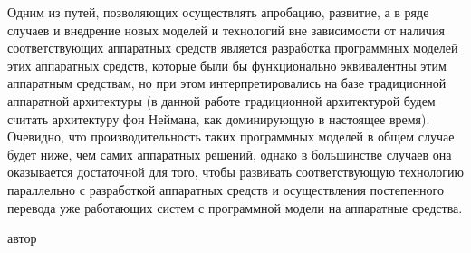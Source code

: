 
Одним из путей, позволяющих осуществлять апробацию, развитие, а в ряде случаев и внедрение новых моделей и технологий
вне зависимости от наличия соответствующих аппаратных средств является разработка программных моделей этих аппаратных
средств, которые были бы функционально эквивалентны этим аппаратным средствам, но при этом интерпретировались на базе
традиционной аппаратной архитектуры (в данной работе традиционной архитектурой будем считать архитектуру фон Неймана,
как доминирующую в настоящее время). Очевидно, что производительность таких программных моделей в общем случае будет
ниже, чем самих аппаратных решений, однако в большинстве случаев она оказывается достаточной для того, чтобы развивать
соответствующую технологию параллельно с разработкой аппаратных средств и осуществления постепенного перевода уже
работающих систем с программной модели на аппаратные средства.


\begin{SCn}
\begin{scnindent}
\end{scnindent}
\begin{scnrelfromlist}{автор}
\end{scnrelfromlist}
\end{SCn}

